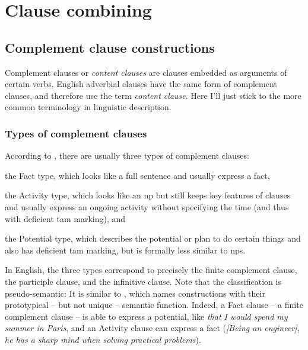 \documentclass[UTF8, a4paper, oneside, scheme=plain]{ctexrep}
\newcommand*{\citesec}[1]{\S~{#1}}
\newcommand*{\term}[1]{\emph{#1}}
\newcommand{\corpus}[1]{\emph{#1}}
\begin{document}
\chapter{Clause combining}\label{chap:clause-combining}

\section{Complement clause constructions}\label{sec:clause-combining.complement-clause}

Complement clauses or \term{content clauses} \citep{cgel} are clauses embedded as arguments of certain verbs.
English adverbial clauses have the same form of complement clauses,
and therefore \citet{cgel} use the term \term{content clause}.
Here I'll just stick to the more common terminology in linguistic description.

\subsection{Types of complement clauses}

According to \citet[\citesec{18.4}]{dixon2010basic2},
there are usually three types of complement clauses:
\begin{enumerate*}
    \item the Fact type, which looks like a full sentence
    and usually express a fact, 
    \item the Activity type, which looks like an \acs{np}
    but still keeps key features of clauses 
    and usually express an ongoing activity 
    without specifying the time (and thus with deficient \acs{tam} marking), and 
    \item the Potential type,
    which describes the potential or plan to do certain things 
    and also has deficient \acs{tam} marking,
    but is formally less similar to \acs{np}s.
\end{enumerate*}
In English, the three types correspond to precisely 
the finite complement clause,
the participle clause,
and the infinitive clause.
Note that the classification is pseudo-semantic:
It is similar to ,
which names constructions with their prototypical -- but not unique -- semantic function.
Indeed, a Fact clause -- a finite complement clause -- 
is able to express a potential,
like \corpus{that I would spend my summer in Paris},
and an Activity clause can express a fact 
(\corpus{[Being an engineer], he has a sharp mind when solving practical problems}).
\end{document}
